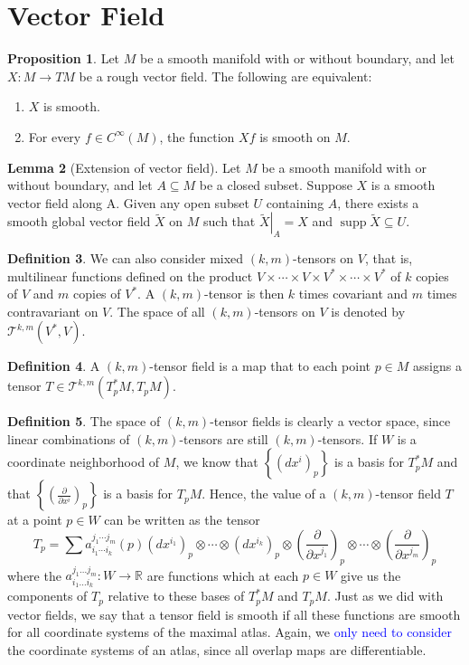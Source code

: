 \documentclass[12pt,a4paper]{book}
\newcommand{\blue}[1]{\textcolor{blue}{#1}}
\newenvironment{enu}{\begin{enumerate}[(1)]}{\end{enumerate}}
\theoremstyle{definition}
\newtheorem{defn}{Definition}[section]
\newtheorem{lem}[defn]{Lemma}
\newtheorem{prop}[defn]{Proposition}
\begin{document}
\section{Vector Field}
\begin{prop}
    Let $M$ be a smooth manifold with or without boundary, and let $X: M \rightarrow T M$ be a rough vector field. The following are equivalent:
    \begin{enu}
        \item $X$ is smooth.
        \item For every $f \in C^{\infty}(M)$, the function $X f$ is smooth on $M$.
    \end{enu}
\end{prop}
\begin{lem}[Extension of vector field]
    Let $M$ be a smooth manifold with or without boundary, and let $A \subseteq M$ be a closed subset. Suppose $X$ is a smooth vector field along A. Given any open subset $U$ containing $A$, there exists a smooth global vector field $\tilde{X}$ on $M$ such that $\left.\tilde{X}\right|_A=X$ and $\operatorname{supp} \tilde{X} \subseteq U$.
    \label{lemma:extension of vector field}
\end{lem}
\begin{defn}
    We can also consider mixed $(k,m)$-tensors on $V$, that is, multilinear functions defined on the product $V \times \cdots \times V \times V^* \times \cdots \times V^*$ of $k$ copies of $V$ and $m$ copies of $V^*$. A $(k, m)$-tensor is then $k$ times covariant and $m$ times contravariant on $V$. The space of all $(k, m)$-tensors on $V$ is denoted by $\mathcal{T}^{k, m}\left(V^*, V\right)$.
\end{defn}
\begin{defn}
    A $(k, m)$-tensor field is a map that to each point $p \in M$ assigns a tensor $T \in \mathcal{T}^{k, m}\left(T_p^* M, T_p M\right)$.
\end{defn}
\begin{defn}
    The space of $(k, m)$-tensor fields is clearly a vector space,
    since linear combinations of $(k, m)$-tensors are still $(k, m)$-tensors.
    If $W$ is a coordinate neighborhood of $M$, we know that $\left\{\left(d x^i\right)_p\right\}$ is a basis for $T_p^* M$ and that $\left\{\left(\frac{\partial}{\partial x^i}\right)_p\right\}$ is a basis for $T_p M$. Hence, the value of a $(k, m)$-tensor field $T$ at a point $p \in W$ can be written as the tensor
    $$
        T_p=\sum a_{i_1 \cdots i_k}^{j_1 \cdots j_m}(p)\left(d x^{i_1}\right)_p \otimes \cdots \otimes\left(d x^{i_k}\right)_p \otimes\left(\frac{\partial}{\partial x^{j_1}}\right)_p \otimes \cdots \otimes\left(\frac{\partial}{\partial x^{j_m}}\right)_p
    $$
    where the $a_{i_1 \ldots i_k}^{j_1 \ldots j_m}: W \rightarrow \mathbb{R}$ are functions which at
    each $p \in W$ give us the components of $T_p$ relative to these bases of $T_p^* M$ and $T_p M$.
    Just as we did with vector fields, we say that a tensor field is smooth if all these functions are smooth for all coordinate systems of the maximal atlas. Again, we \blue{only need to consider} the coordinate systems of an atlas, since all overlap maps are differentiable.
\end{defn}
\end{document}
